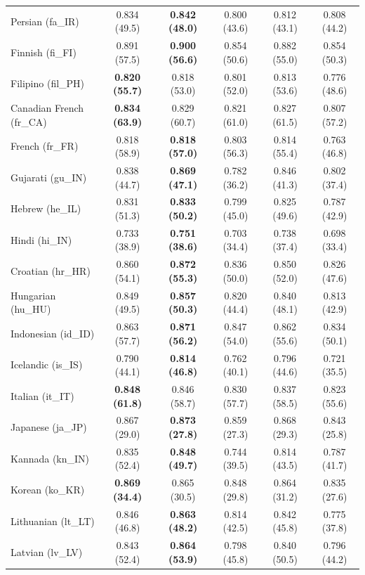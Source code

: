 \begin{longtable}{@{}lccccc@{}}
    Persian (fa\_IR) & 0.834 (49.5) & \textbf{0.842 (48.0)} & 0.800 (43.6) & 0.812 (43.1) & 0.808 (44.2) \\
    Finnish (fi\_FI) & 0.891 (57.5) & \textbf{0.900 (56.6)} & 0.854 (50.6) & 0.882 (55.0) & 0.854 (50.3) \\
    Filipino (fil\_PH) & \textbf{0.820 (55.7)} & 0.818 (53.0) & 0.801 (52.0) & 0.813 (53.6) & 0.776 (48.6) \\
    Canadian French (fr\_CA) & \textbf{0.834 (63.9)} & 0.829 (60.7) & 0.821 (61.0) & 0.827 (61.5) & 0.807 (57.2) \\
    French (fr\_FR) & 0.818 (58.9) & \textbf{0.818 (57.0)} & 0.803 (56.3) & 0.814 (55.4) & 0.763 (46.8) \\
    Gujarati (gu\_IN) & 0.838 (44.7) & \textbf{0.869 (47.1)} & 0.782 (36.2) & 0.846 (41.3) & 0.802 (37.4) \\
    Hebrew (he\_IL) & 0.831 (51.3) & \textbf{0.833 (50.2)} & 0.799 (45.0) & 0.825 (49.6) & 0.787 (42.9) \\
    Hindi (hi\_IN) & 0.733 (38.9) & \textbf{0.751 (38.6)} & 0.703 (34.4) & 0.738 (37.4) & 0.698 (33.4) \\
    Croatian (hr\_HR) & 0.860 (54.1) & \textbf{0.872 (55.3)} & 0.836 (50.0) & 0.850 (52.0) & 0.826 (47.6) \\
    Hungarian (hu\_HU) & 0.849 (49.5) & \textbf{0.857 (50.3)} & 0.820 (44.4) & 0.840 (48.1) & 0.813 (42.9) \\
    Indonesian (id\_ID) & 0.863 (57.7) & \textbf{0.871 (56.2)} & 0.847 (54.0) & 0.862 (55.6) & 0.834 (50.1) \\
    Icelandic (is\_IS) & 0.790 (44.1) & \textbf{0.814 (46.8)} & 0.762 (40.1) & 0.796 (44.6) & 0.721 (35.5) \\
    Italian (it\_IT) & \textbf{0.848 (61.8)} & 0.846 (58.7) & 0.830 (57.7) & 0.837 (58.5) & 0.823 (55.6) \\
    Japanese (ja\_JP) & 0.867 (29.0) & \textbf{0.873 (27.8)} & 0.859 (27.3) & 0.868 (29.3) & 0.843 (25.8) \\
    Kannada (kn\_IN) & 0.835 (52.4) & \textbf{0.848 (49.7)} & 0.744 (39.5) & 0.814 (43.5) & 0.787 (41.7) \\
    Korean (ko\_KR) & \textbf{0.869 (34.4)} & 0.865 (30.5) & 0.848 (29.8) & 0.864 (31.2) & 0.835 (27.6) \\
    Lithuanian (lt\_LT) & 0.846 (46.8) & \textbf{0.863 (48.2)} & 0.814 (42.5) & 0.842 (45.8) & 0.775 (37.8) \\
    Latvian (lv\_LV) & 0.843 (52.4) & \textbf{0.864 (53.9)} & 0.798 (45.8) & 0.840 (50.5) & 0.796 (44.2) \\

\end{longtable}
